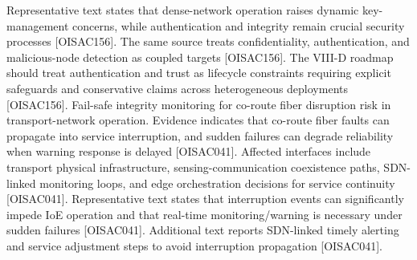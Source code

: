  Representative text states that dense-network operation raises dynamic key-management concerns, while authentication and integrity remain crucial security processes [O\markdownRendererUnderscore{}ISAC\markdownRendererUnderscore{}156]. The same source treats confidentiality, authentication, and malicious-node detection as coupled targets [O\markdownRendererUnderscore{}ISAC\markdownRendererUnderscore{}156].\markdownRendererOlItemEnd 
{} The VIII-D roadmap should treat authentication and trust as lifecycle constraints requiring explicit safeguards and conservative claims across heterogeneous deployments [O\markdownRendererUnderscore{}ISAC\markdownRendererUnderscore{}156].\markdownRendererOlItemEnd 
\markdownRendererOlEnd \markdownRendererInterblockSeparator
{}
\markdownRendererSectionEnd \markdownRendererSectionBegin
{}\markdownRendererInterblockSeparator
{}\markdownRendererOlBegin
{} Fail-safe integrity monitoring for co-route fiber disruption risk in transport-network operation.\markdownRendererOlItemEnd 
{} Evidence indicates that co-route fiber faults can propagate into service interruption, and sudden failures can degrade reliability when warning response is delayed [O\markdownRendererUnderscore{}ISAC\markdownRendererUnderscore{}041].\markdownRendererOlItemEnd 
{} Affected interfaces include transport physical infrastructure, sensing-communication coexistence paths, SDN-linked monitoring loops, and edge orchestration decisions for service continuity [O\markdownRendererUnderscore{}ISAC\markdownRendererUnderscore{}041].\markdownRendererOlItemEnd 
{} Representative text states that interruption events can significantly impede IoE operation and that real-time monitoring/warning is necessary under sudden failures [O\markdownRendererUnderscore{}ISAC\markdownRendererUnderscore{}041]. Additional text reports SDN-linked timely alerting and service adjustment steps to avoid interruption propagation [O\markdownRendererUnderscore{}ISAC\markdownRendererUnderscore{}041].\markdownRendererOlItemEnd 
